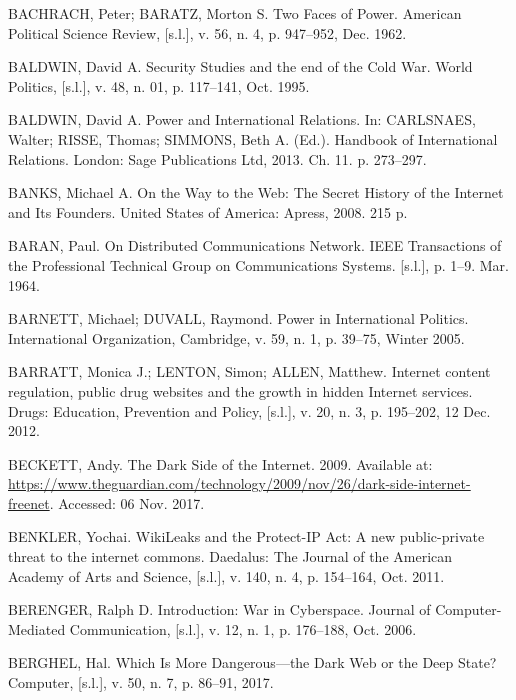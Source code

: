 \begin{list}{}{\setlength{\leftmargin}{0pt}\setlength{\itemsep}{6pt}\setlength{\parsep}{0pt}}
\item BACHRACH, Peter; BARATZ, Morton S. Two Faces of Power. American Political Science Review, [s.l.], v. 56, n. 4, p. 947--952, Dec. 1962.

\item BALDWIN, David A. Security Studies and the end of the Cold War. World Politics, [s.l.], v. 48, n. 01, p. 117--141, Oct. 1995.

\item BALDWIN, David A. Power and International Relations. In: CARLSNAES, Walter; RISSE, Thomas; SIMMONS, Beth A. (Ed.). Handbook of International Relations. London: Sage Publications Ltd, 2013. Ch. 11. p. 273--297.

\item BANKS, Michael A. On the Way to the Web: The Secret History of the Internet and Its Founders. United States of America: Apress, 2008. 215 p.

\item BARAN, Paul. On Distributed Communications Network. IEEE Transactions of the Professional Technical Group on Communications Systems. [s.l.], p. 1--9. Mar. 1964.

\item BARNETT, Michael; DUVALL, Raymond. Power in International Politics. International Organization, Cambridge, v. 59, n. 1, p. 39--75, Winter 2005.

\item BARRATT, Monica J.; LENTON, Simon; ALLEN, Matthew. Internet content regulation, public drug websites and the growth in hidden Internet services. Drugs: Education, Prevention and Policy, [s.l.], v. 20, n. 3, p. 195--202, 12 Dec. 2012.

\item BECKETT, Andy. The Dark Side of the Internet. 2009. Available at: \url{https://www.theguardian.com/technology/2009/nov/26/dark-side-internet-freenet}. Accessed: 06 Nov. 2017.

\item BENKLER, Yochai. WikiLeaks and the Protect-IP Act: A new public-private threat to the internet commons. Daedalus: The Journal of the American Academy of Arts and Science, [s.l.], v. 140, n. 4, p. 154--164, Oct. 2011.

\item BERENGER, Ralph D. Introduction: War in Cyberspace. Journal of Computer-Mediated Communication, [s.l.], v. 12, n. 1, p. 176--188, Oct. 2006.

\item BERGHEL, Hal. Which Is More Dangerous---the Dark Web or the Deep State? Computer, [s.l.], v. 50, n. 7, p. 86--91, 2017.


\end{list}
